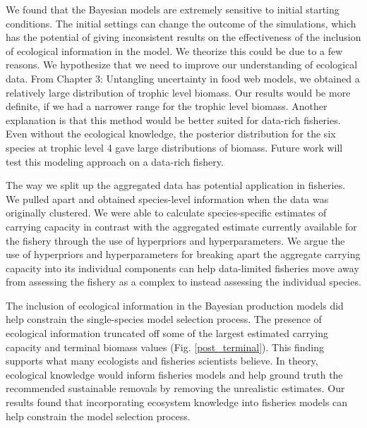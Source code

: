 \documentclass[oneside,12pt,final]{sty/ucthesis-CA2012}
\begin{document}
\begin{mainmatter}
\vspace{5mm}

We found that the Bayesian models are extremely sensitive to initial starting conditions. The initial settings can change the outcome of the simulations, which has the potential of giving inconsistent results on the effectiveness of the inclusion of ecological information in the model. We theorize this could be due to a few reasons. We hypothesize that we need to improve our understanding of ecological data. From Chapter 3: Untangling uncertainty in food web models, we obtained a relatively large distribution of trophic level biomass. Our results would be more definite, if we had a narrower range for the trophic level biomass. Another explanation is that this method would be better suited for data-rich fisheries. Even without the ecological knowledge, the posterior distribution for the six species at trophic level 4 gave large distributions of biomass. Future work will test this modeling approach on a data-rich fishery.

\vspace{5mm}

The way we split up the aggregated data has potential application in fisheries. We pulled apart and obtained species-level information when the data was originally clustered. We were able to calculate species-specific estimates of carrying capacity in contrast with the aggregated estimate currently available for the fishery through the use of hyperpriors and hyperparameters. We argue the use of hyperpriors and hyperparameters for breaking apart the aggregate carrying capacity into its individual components can help data-limited fisheries move away from assessing the fishery as a complex to instead assessing the individual species. 

\vspace{5mm}
 
The inclusion of ecological information in the Bayesian production models did help constrain the single-species model selection process. The presence of ecological information truncated off some of the largest estimated carrying capacity and terminal biomass values (Fig. \ref{post_terminal}). This finding  supports what many ecologists and fisheries scientists believe. In theory, ecological knowledge would inform fisheries models and help ground truth the recommended sustainable removals by removing the unrealistic estimates. Our results found that incorporating ecosystem knowledge into fisheries models can help constrain the model selection process.
 

\end{mainmatter}
\end{document}
